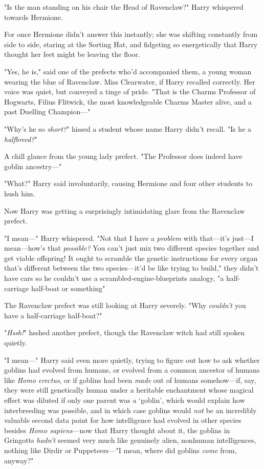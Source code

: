"Is the man standing on his chair the Head of Ravenclaw?" Harry whispered
towards Hermione.

For once Hermione didn't answer this instantly; she was shifting constantly
from side to side, staring at the Sorting Hat, and fidgeting so energetically
that Harry thought her feet might be leaving the floor.

"Yes, he is," said one of the prefects who'd accompanied them, a young woman
wearing the blue of Ravenclaw. Miss Clearwater, if Harry recalled correctly.
Her voice was quiet, but conveyed a tinge of pride. "That is the Charms
Professor of Hogwarts, Filius Flitwick, the most knowledgeable Charms Master
alive, and a past Duelling Champion—"

"Why's he so \emph{short?}" hissed a student whose name Harry didn't recall.
"Is he a \emph{halfbreed?}"

A chill glance from the young lady prefect. "The Professor does indeed have
goblin ancestry—"

"What?" Harry said involuntarily, causing Hermione and four other students to
hush him.

Now Harry was getting a surprisingly intimidating glare from the Ravenclaw
prefect.

"I mean—" Harry whispered. "Not that I have a \emph{problem} with that—it's
just—I mean—how's that \emph{possible?} You can't just mix two different
species together and get viable offspring! It ought to scramble the genetic
instructions for every organ that's different between the two species—it'd be
like trying to build," they didn't have cars so he couldn't use a
scrambled-engine-blueprints analogy, "a half-carriage half-boat or
something{\el}"

The Ravenclaw prefect was still looking at Harry severely. "Why \emph{couldn't}
you have a half-carriage half-boat?"

"\emph{Hssh!}" hsshed another prefect, though the Ravenclaw witch had still
spoken quietly.

"I mean—" Harry said even more quietly, trying to figure out how to ask
whether goblins had evolved from humans, or evolved from a common ancestor of
humans like \emph{Homo erectus}, or if goblins had been \emph{made} out of
humans somehow—if, say, they were still genetically human under a heritable
enchantment whose magical effect was diluted if only one parent was a `goblin',
which would explain how interbreeding was possible, and in which case goblins
would \emph{not} be an incredibly valuable second data point for how
intelligence had evolved in other species besides \emph{Homo sapiens}—now
that Harry thought about it, the goblins in Gringotts \emph{hadn't} seemed very
much like genuinely alien, nonhuman intelligences, nothing like Dirdir or
Puppeteers—"I mean, where did goblins \emph{come} from, anyway?"


